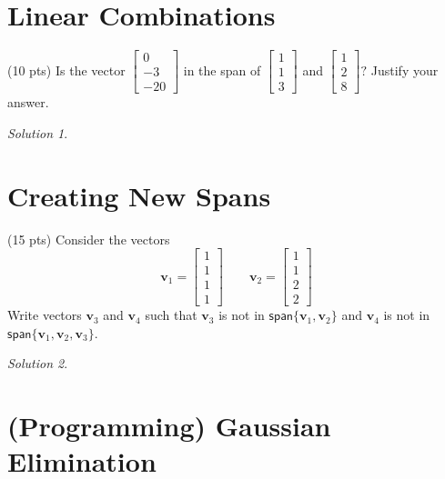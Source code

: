 \documentclass{article}
\theoremstyle{remark}
\newtheorem*{solution}{Solution}
\begin{document}
\pagebreak
\section{Linear Combinations}
(10 pts) Is the vector
$
\begin{bmatrix}
  0 \\ -3 \\ -20
\end{bmatrix}
$
in the span of
$
\begin{bmatrix}
  1 \\ 1 \\ 3
\end{bmatrix}
$
and
$
\begin{bmatrix}
  1 \\ 2 \\ 8
\end{bmatrix}?
$
Justify your answer.

\begin{solution}
\end{solution}

\pagebreak
\section{Creating New Spans}
(15 pts) Consider the vectors
\begin{displaymath}
  \mathbf v_1 =
  \begin{bmatrix}
    1 \\ 1 \\ 1 \\ 1
  \end{bmatrix}
  \qquad
  \mathbf v_2 =
  \begin{bmatrix}
    1 \\ 1 \\ 2 \\ 2
  \end{bmatrix}
\end{displaymath}
Write vectors $\mathbf v_3$ and $\mathbf v_4$ such that $\mathbf v_3$ is not in $\mathsf{span}\{\mathbf v_1, \mathbf v_2\}$ and $\mathbf v_4$ is not in $\mathsf{span}\{\mathbf v_1, \mathbf v_2, \mathbf v_3\}$.

\begin{solution}
\end{solution}

\pagebreak
\section{(Programming) Gaussian Elimination}
\end{document}
